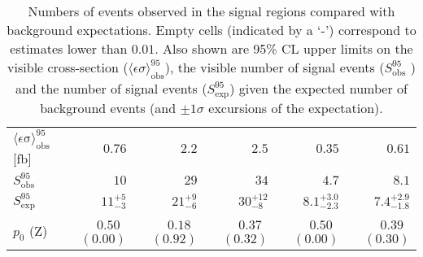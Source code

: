 \begin{table}[tbp]
\begin{center}
\begin{tabular}{|lrrrrr|}
$\langle\epsilon\mathrm{ \sigma}\rangle_\mathrm{ obs}^{95}$ [fb]   &$0.76$   & $2.2$ & $2.5$  & $0.35$ & $0.61$  \\
$S_\mathrm{ obs}^{95}$     & $10$ & $29$ &  $34$  & $4.7$ & $8.1$ \\
$S_\mathrm{ exp}^{95}$     & $ { 11 }^{ +5 }_{ -3 }$ &  $ { 21 }^{ +9 }_{ -6 }$ & $ { 30 }^{ +12 }_{ -8 }$ & $ { 8.1 }^{ +3.0 }_{ -2.3 }$ & $ { 7.4 }^{ +2.9 }_{ -1.8 }$ \\
$p_{0}$ ($\mathrm{Z}$)        & $ 0.50$~$(0.00)$  & $ 0.18$~$(0.92)$ & $ 0.37$~$(0.32)$ & $ 0.50$~$(0.00)$  & $ 0.39$~$(0.30)$ \\
\hline
\end{tabular}


\vspace*{-0.01\textheight}\caption{Numbers of events observed in the signal regions compared with background expectations.
Empty cells (indicated by a `-') correspond to estimates lower than $0.01$.
Also shown are 95\% CL upper limits on the visible cross-section ($\langle\epsilon\sigma\rangle_\mathrm{ obs}^{95}$),
the visible number of signal events ($S_\mathrm{ obs}^{95}$ ) and the number of signal events ($S_\mathrm{ exp}^{95}$)
given the expected number of background events (and $\pm 1\sigma$ excursions of the expectation).
\label{tab:p0_UL_RJR}}
\end{center}
\end{table}
